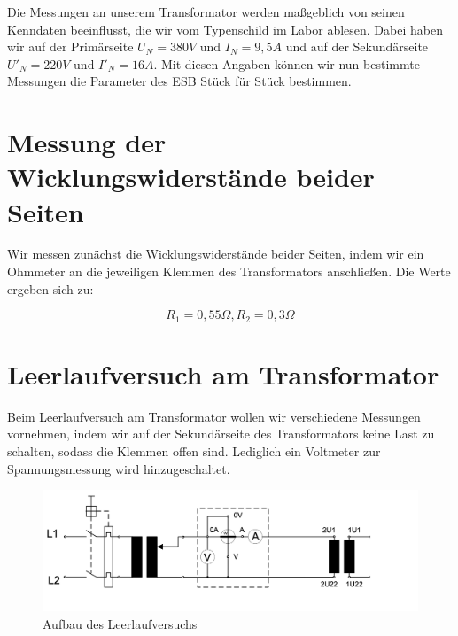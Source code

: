 \documentclass{article}
\begin{document}
\noindent
Die Messungen an unserem Transformator werden maßgeblich von seinen Kenndaten beeinflusst, die wir vom Typenschild im Labor ablesen. Dabei haben wir auf der Primärseite $U_{N} = 380V$ und $I_{N} = 9,5A$ und auf der Sekundärseite $U'_{N} = 220V$ und $I'_{N} = 16A$. Mit diesen Angaben können wir nun bestimmte Messungen die Parameter des ESB Stück für Stück bestimmen.

\newpage
\section{Messung der Wicklungswiderstände beider Seiten}

Wir messen zunächst die Wicklungswiderstände beider Seiten, indem wir ein Ohmmeter an die jeweiligen Klemmen des Transformators anschließen. Die Werte ergeben sich zu:

\begin{equation*}
  \label{eq:1}
  R_{1} = 0,55\Omega, R_{2} = 0,3\Omega
\end{equation*}

\section{Leerlaufversuch am Transformator}

Beim Leerlaufversuch am Transformator wollen wir verschiedene Messungen vornehmen, indem wir auf der Sekundärseite des Transformators keine Last zu schalten, sodass die Klemmen offen sind. Lediglich ein Voltmeter zur Spannungsmessung wird hinzugeschaltet.

\begin{figure}[h]
  \centering
  \includegraphics[width=\textwidth]{../assets/images/gep3/leerlauf_aufbau.png}
  \caption{Aufbau des Leerlaufversuchs}
  \label{fig:leerlaufaufbau}
\end{figure}
\end{document}
